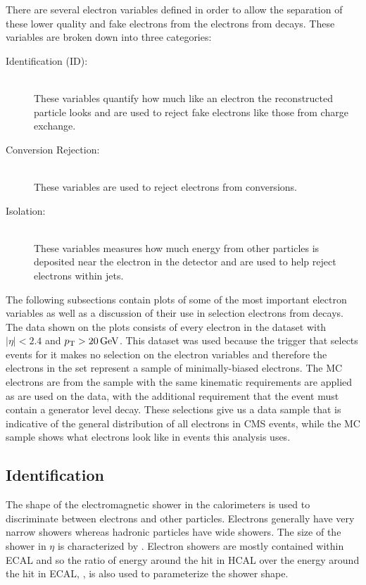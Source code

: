 There are several electron variables defined in order to allow the separation
of these lower quality and fake electrons from the electrons from \Ztoee
decays. These variables are broken down into three categories:

\begin{description}
    \item[Identification (ID):] \hfill \\
        These variables quantify how much like an electron the reconstructed
        particle looks and are used to reject fake electrons like those from
        charge exchange.
    \item[Conversion Rejection:] \hfill \\
        These variables are used to reject electrons from \PhotonConversion
        conversions.
    \item[Isolation:] \hfill \\
        These variables measures how much energy from other particles is
        deposited near the electron in the detector and are used to help reject
        electrons within jets.
\end{description}

The following subsections contain plots of some of the most important electron
variables as well as a discussion of their use in selection electrons from
\Ztoee decays. The data shown on the plots consists of every electron in the
\SingleMuon dataset with $|\eta| < 2.4$ and $p_{\mathrm{T}} > 20 \,\text{Ge\hspace{-.08em}V}$. This dataset was
used because the trigger that selects events for it makes no selection on the
electron variables and therefore the electrons in the set represent a sample of
minimally-biased electrons. The MC electrons are from the \MADGRAPH \DYtoll
sample with the same kinematic requirements are applied as are used on the
data, with the additional requirement that the event must contain a generator
level \Ztoee decay. These selections give us a data sample that is indicative
of the general distribution of all electrons in CMS events, while the MC sample
shows what electrons look like in events this analysis uses.

\subsection{Identification}

The shape of the electromagnetic shower in the calorimeters is used to
discriminate between electrons and other particles. Electrons generally have
very narrow showers whereas hadronic particles have wide showers. The size of
the shower in $\eta$ is characterized by \sigmaietaieta. Electron showers are
mostly contained within ECAL and so the ratio of energy around the hit in HCAL
over the energy around the hit in ECAL, \HOverE, is also used to parameterize
the shower shape.

